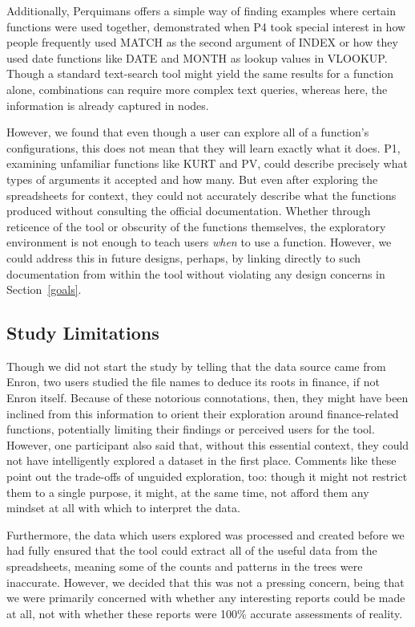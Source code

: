 \documentclass[conference]{IEEEtran}
\newcommand{\toolname}{Perquimans } \newcommand{\toolnameend}{Perquimans}
\begin{document}
	Additionally, \toolname offers a simple way of finding examples where certain
	functions were used together, demonstrated when P4 took special interest in how people
	frequently used MATCH as the second argument of INDEX or how they used date functions
	like DATE and MONTH as lookup values in VLOOKUP. Though a standard text-search tool might yield
	the same results for a function alone, combinations can require more complex
	text queries, whereas here, the information is already captured in nodes.  \par
	
	However, we found that even though a user can explore all of a function's
	configurations, this does not mean that they will learn exactly what it does.
	P1, examining unfamiliar functions like KURT and PV, could describe precisely
	what types of arguments it accepted and how many. But even after exploring the
	spreadsheets for context, they could not accurately describe what the functions
	produced without consulting the official documentation. Whether through
	reticence of the tool or obscurity of the functions themselves, the exploratory
	environment is not enough to teach users \textit{when} to use a function.
	However, we could address this in future designs, perhaps, by linking directly
	to such documentation from within the tool without violating any design
	concerns in Section~\ref{goals}. \par
	
	\subsection{Study Limitations} Though we did not start the study by telling
	that the data source came from Enron, two users studied the file names to
	deduce its roots in finance, if not Enron itself. Because of these notorious
	connotations, then, they might have been inclined from this information to
	orient their exploration around finance-related functions, potentially limiting
	their findings or perceived users for the tool. However, one participant also said that,
	without this essential context, they could not have intelligently explored a dataset
	in the first place. Comments like these point out the trade-offs of unguided
	exploration, too: though it might not restrict them to a single purpose, it
	might, at the same time, not afford them any mindset at all with which to
	interpret the data. \par
	
	Furthermore, the data which users explored was processed and created before we
	had fully ensured that the tool could extract all of the useful data from the 
	spreadsheets, meaning some of the counts and patterns in the
	trees were inaccurate. However, we decided that this was not a pressing
	concern, being that we were primarily concerned with whether any interesting
	reports could be made at all, not with whether these reports were 100\%
	accurate assessments of reality. \par
	
\end{document}
